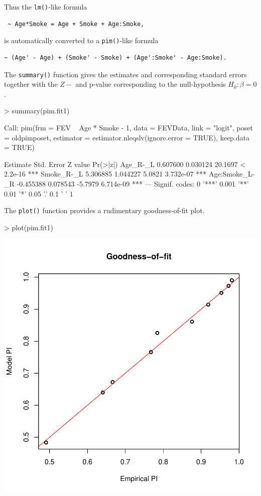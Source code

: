 \documentclass[12pt]{article}
\begin{document}
Thus the \texttt{lm()}-like formula 
\begin{verbatim}
 ~ Age*Smoke = Age + Smoke + Age:Smoke,
\end{verbatim}
is automatically converted to a \texttt{pim()}-like formula
\begin{verbatim}
~ (Age' - Age) + (Smoke' - Smoke) + (Age':Smoke' - Age:Smoke).
\end{verbatim}
The \texttt{summary()} function gives the estimates and corresponding standard errors together with the $Z-$ and p-value corresponding to the null-hypothesis $H_0: \beta = 0$. 
\begin{Schunk}
\begin{Sinput}
> summary(pim.fit1)
\end{Sinput}
\begin{Soutput}
Call:
pim(frm = FEV ~ Age * Smoke - 1, data = FEVData, link = "logit", 
    poset = oldpimposet, estimator = estimator.nleqslv(ignore.error = TRUE), 
    keep.data = TRUE)

                Estimate Std. Error Z value  Pr(>|z|)    
Age_R-_L        0.607600   0.030124 20.1697 < 2.2e-16 ***
Smoke_R-_L      5.306885   1.044227  5.0821 3.732e-07 ***
Age:Smoke_L-_R -0.455388   0.078543 -5.7979 6.714e-09 ***
---
Signif. codes:  0 '***' 0.001 '**' 0.01 '*' 0.05 '.' 0.1 ' ' 1 
\end{Soutput}
\end{Schunk}
The \texttt{plot()} function provides a rudimentary goodness-of-fit plot.
\begin{center}
\begin{Schunk}
\begin{Sinput}
> plot(pim.fit1)
\end{Sinput}
\end{Schunk}
\includegraphics{pim-004}
\end{center}
\end{document}
